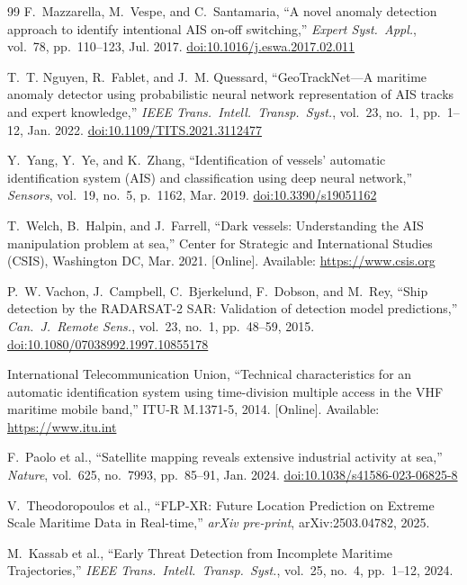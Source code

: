 \documentclass[journal]{IEEEtran}
\newcommand{\doi}[1]{\href{https://doi.org/#1}{doi:#1}}
\begin{document}
\begin{thebibliography}{99}
F.~Mazzarella, M.~Vespe, and C.~Santamaria,
``A novel anomaly detection approach to identify intentional AIS on-off
switching,''
\textit{Expert Syst.\ Appl.}, vol.~78, pp.~110--123, Jul. 2017.
\doi{10.1016/j.eswa.2017.02.011}

T.~T. Nguyen, R.~Fablet, and J.~M. Quessard,
``GeoTrackNet—A maritime anomaly detector using probabilistic neural
network representation of AIS tracks and expert knowledge,''
\textit{IEEE Trans.\ Intell.\ Transp.\ Syst.}, vol.~23, no.~1,
pp.~1--12, Jan. 2022.
\doi{10.1109/TITS.2021.3112477}

Y.~Yang, Y.~Ye, and K.~Zhang,
``Identification of vessels' automatic identification system (AIS)
and classification using deep neural network,''
\textit{Sensors}, vol.~19, no.~5, p.~1162, Mar. 2019.
\doi{10.3390/s19051162}

T.~Welch, B.~Halpin, and J.~Farrell,
``Dark vessels: Understanding the AIS manipulation problem at sea,''
Center for Strategic and International Studies (CSIS), Washington DC,
Mar. 2021. [Online]. Available: \url{https://www.csis.org}

P.~W. Vachon, J.~Campbell, C.~Bjerkelund, F.~Dobson, and M.~Rey,
``Ship detection by the RADARSAT-2 SAR: Validation of detection model
predictions,''
\textit{Can.\ J.\ Remote Sens.}, vol.~23, no.~1, pp.~48--59, 2015.
\doi{10.1080/07038992.1997.10855178}

International Telecommunication Union,
``Technical characteristics for an automatic identification system
using time-division multiple access in the VHF maritime mobile band,''
ITU-R M.1371-5, 2014.
[Online]. Available: \url{https://www.itu.int}

F.~Paolo et al.,
``Satellite mapping reveals extensive industrial activity at sea,''
\textit{Nature}, vol.~625, no.~7993, pp.~85--91, Jan. 2024.
\doi{10.1038/s41586-023-06825-8}

V.~Theodoropoulos et al.,
``FLP-XR: Future Location Prediction on Extreme Scale Maritime Data in Real-time,''
\textit{arXiv pre-print}, arXiv:2503.04782, 2025.

M.~Kassab et al.,
``Early Threat Detection from Incomplete Maritime Trajectories,''
\textit{IEEE Trans.\ Intell.\ Transp.\ Syst.}, vol.~25, no.~4, pp.~1--12, 2024.


\end{thebibliography}
\end{document}
